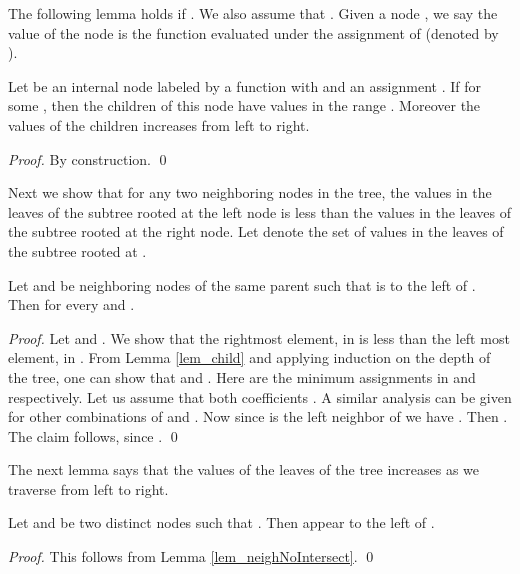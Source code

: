 \documentclass[envcountsame]{llncs}
\begin{document}
The following lemma holds if . We also assume that .
Given a node , we say the value of the node is the function  evaluated under the assignment of  (denoted by ).
\begin{lemma}
\label{lem_child}
Let  be an internal node labeled by a function  with  and an assignment .
If  for some , then the children of this node have values in the range .
Moreover the values of the children increases from left to right.
\end{lemma}
\begin{proof}
By construction.
\qed \end{proof}

Next we show that for any two neighboring nodes in the tree, the values in the leaves of the subtree rooted at the left node is less 
than the values in the leaves of the subtree rooted at the right node. Let  denote the set of values in the leaves of the subtree rooted at .

\begin{lemma}
 \label{lem_neighNoIntersect}
Let  and  be neighboring nodes of the same parent such that  is to the left of . Then  for every  and .
\end{lemma}
\begin{proof}
Let  and . We show that the rightmost element,  in  is less 
than the left most element,  in . From Lemma \ref{lem_child} and applying induction on the depth of the tree, one can show that  and 
. Here  are the minimum assignments in  and  respectively.
Let us assume that both coefficients . A similar analysis can be given for other combinations of  and
. 
Now since  is the left neighbor of  we have .  Then 
. The claim follows, since .
\qed \end{proof}
The next lemma says that the values of the leaves of the tree increases as we traverse from left to right.

\begin{lemma} \label{lem_tree}
Let  and  be two distinct nodes such that . Then  appear to the left of .
\end{lemma}
\begin{proof}
This follows from Lemma \ref{lem_neighNoIntersect}.
\qed \end{proof}
\end{document}
